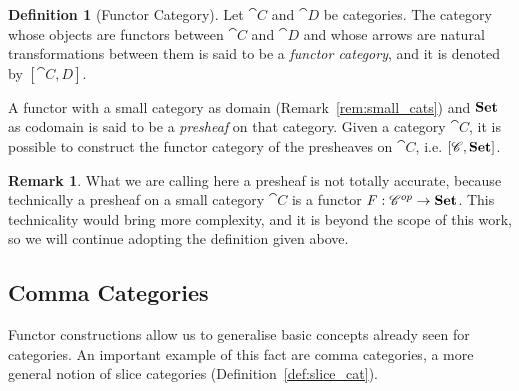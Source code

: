 \documentclass[a4paper, twoside,openright]{report}
\theoremstyle{plain}
\theoremstyle{definition}
\newtheorem{definition}[theorem]{Definition}
\newtheorem{remark}[theorem]{Remark}
\begin{document}
\begin{definition}[Functor Category]\label{def:functor_category}
    Let $\cat C$ and $\cat D$ be categories. The category whose objects are functors between $\cat C$ and $\cat D$ and whose arrows are natural transformations between them is said to be a \emph{functor category}, and it is denoted by $[\cat{C, D}]$.
\end{definition}

A functor with a small category as domain (Remark~\ref{rem:small_cats}) and $\mathbf{Set}$ as codomain is said to be a \emph{presheaf} on that category. Given a category $\cat C$, it is possible to construct the functor category of the presheaves on $\cat C$, i.e. $[\mathscr{C}, \mathbf{Set}]$.

\begin{remark}
    What we are calling here a presheaf is not totally accurate, because technically a presheaf on a small category $\cat C$ is a functor $F: \mathscr{C} ^{op} \rightarrow \mathbf{Set}$. This technicality would bring more complexity, and it is beyond the scope of this work, so we will continue adopting the definition given above.
\end{remark}

\subsection{Comma Categories}

Functor constructions allow us to generalise basic concepts already seen for categories. An important example of this fact are comma categories, a more general notion of slice categories (Definition~\ref{def:slice_cat}).

\end{document}
